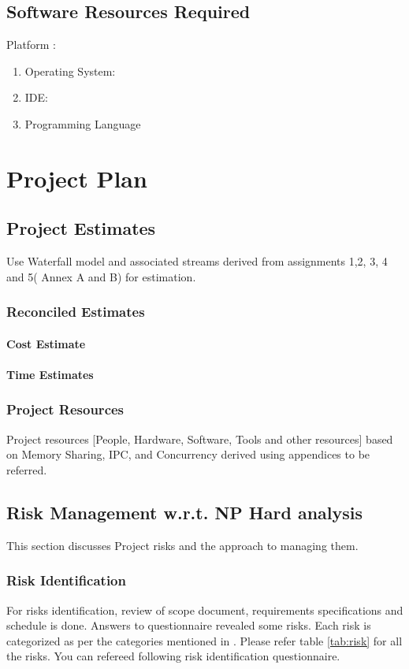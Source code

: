 \documentclass[oneside,a4paper,12pt]{report}
\begin{document}
\section{Software Resources Required}
Platform :
\begin{enumerate}
\item Operating System:
\item IDE:
\item Programming Language
\end{enumerate}




\chapter{Project Plan}

\section{Project Estimates}
                 Use Waterfall model and associated streams derived from assignments 1,2, 3, 4 and 5( Annex A and B) for estimation.
\subsection{Reconciled Estimates}
\subsubsection{Cost Estimate}

\subsubsection{Time Estimates}


\subsection{Project Resources}
          Project resources  [People, Hardware, Software, Tools and other resources] based on Memory Sharing, IPC, and Concurrency derived using appendices to be referred.

\section{Risk Management w.r.t. NP Hard analysis}
This section discusses Project risks and the approach to managing them.
\subsection{Risk Identification}
For risks identification, review of scope document, requirements specifications and schedule is done. Answers to questionnaire revealed some risks. Each risk is categorized as per the categories mentioned in \cite{bookPressman}. Please refer table \ref{tab:risk} for all the risks. You can refereed following risk identification questionnaire.
\end{document}
